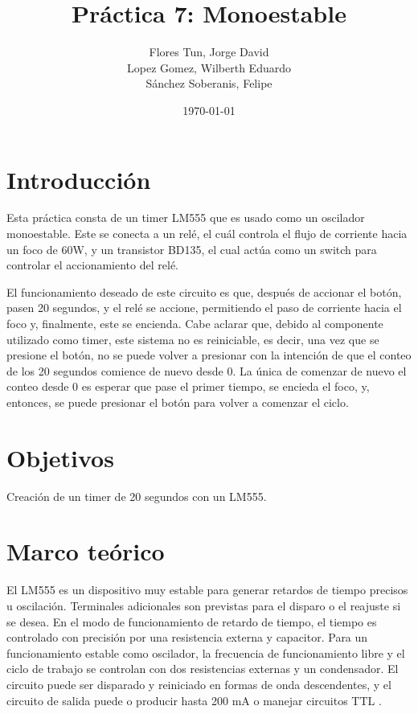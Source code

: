 \documentclass{article}
\title{Práctica 7: Monoestable}
\author{
    Flores Tun, Jorge David \\
    Lopez Gomez, Wilberth Eduardo \\
    Sánchez Soberanis, Felipe
}
\date{\today}
\begin{document}
\maketitle

\tableofcontents

\section{Introducción}

Esta práctica consta de un timer LM555 que es usado como un oscilador monoestable. Este se conecta a un relé, el cuál controla el flujo de corriente hacia un foco de 60W, y un transistor BD135, el cual actúa como un switch para controlar el accionamiento del relé.

El funcionamiento deseado de este circuito es que, después de accionar el botón, pasen 20 segundos, y el relé se accione, permitiendo el paso de corriente hacia el foco y, finalmente, este se encienda. Cabe aclarar que, debido al componente utilizado como timer, este sistema no es reiniciable, es decir, una vez que se presione el botón, no se puede volver a presionar con la intención de que el conteo de los 20 segundos comience de nuevo desde 0. La única de comenzar de nuevo el conteo desde 0 es esperar que pase el primer tiempo, se encieda el foco, y, entonces, se puede presionar el botón para volver a comenzar el ciclo.

\section{Objetivos}

Creación de un timer de 20 segundos con un LM555.

\section{Marco teórico}

El LM555 es un dispositivo muy estable para generar retardos de tiempo precisos u oscilación. Terminales adicionales son previstas para el disparo o el reajuste si se desea. En el modo de funcionamiento de retardo de tiempo, el tiempo es controlado con precisión por una resistencia externa y capacitor. Para un funcionamiento estable como oscilador, la frecuencia de funcionamiento libre y el ciclo de trabajo se controlan con dos resistencias externas y un condensador. El circuito puede ser disparado y reiniciado en formas de onda descendentes, y el circuito de salida puede o producir hasta 200 mA o manejar circuitos TTL \parencite{texas_instruments_lm555_2015}.
\end{document}
